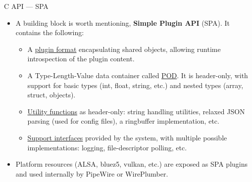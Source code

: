 \begin{frame}[fragile]{C API — SPA}
  \begin{itemize}

  \item A building block is worth mentioning, \textbf{Simple Plugin
    API} (SPA). It contains the following:

    \begin{itemize}
    \item A \href{https://docs.pipewire.org/page_spa.html#autotoc_md225
      }{plugin format} encapsulating shared objects, allowing
      runtime introspection of the plugin content.
    \item A Type-Length-Value data container called \href{
      https://docs.pipewire.org/page_spa_pod.html}{POD}. It is
      header-only, with support for basic types (int, float,
      string, etc.) and nested types (array, struct, objects).
    \item \href{https://docs.pipewire.org/group__spa__utils.html}{Utility
      functions} as header-only: string handling utilities,
      relaxed JSON parsing (used for config files), a ringbuffer
      implementation, etc.
    \item \href{https://docs.pipewire.org/group__spa__support.html}{Support
      interfaces} provided by the system, with multiple
      possible implementations: logging, file-descriptor polling, etc.
    \end{itemize}

  \item Platform resources (ALSA, bluez5, vulkan, etc.) are exposed
    as SPA plugins and used internally by PipeWire or WirePlumber.

  \end{itemize}
\end{frame}



